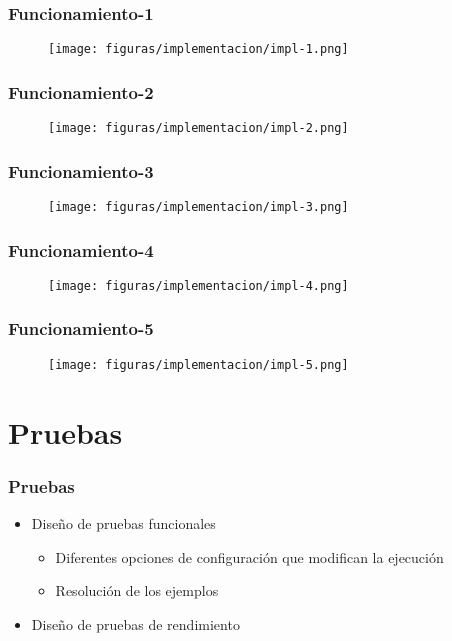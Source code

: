 \documentclass{beamer}
\begin{document}
\begin{frame}{}
    \frametitle{Funcionamiento-1}
    \begin{figure}[H]
        \centerline{\texttt{[image: figuras/implementacion/impl-1.png]}}
    \end{figure}
\end{frame}

\begin{frame}{}
    \frametitle{Funcionamiento-2}
    \begin{figure}[H]
        \centerline{\texttt{[image: figuras/implementacion/impl-2.png]}}
    \end{figure}
\end{frame}

\begin{frame}{}
    \frametitle{Funcionamiento-3}
    \begin{figure}[H]
        \centerline{\texttt{[image: figuras/implementacion/impl-3.png]}}
    \end{figure}
\end{frame}

\begin{frame}{}
    \frametitle{Funcionamiento-4}
    \begin{figure}[H]
        \centerline{\texttt{[image: figuras/implementacion/impl-4.png]}}
    \end{figure}
\end{frame}


\begin{frame}{}
    \frametitle{Funcionamiento-5}
    \begin{figure}[H]
        \centerline{\texttt{[image: figuras/implementacion/impl-5.png]}}
    \end{figure}
\end{frame}

\section{Pruebas}

\begin{frame}{}
    \frametitle{Pruebas}
    \begin{itemize}
        \item Diseño de pruebas funcionales
        \begin{itemize}
            \item Diferentes opciones de configuración que modifican la ejecución
            \item Resolución de los ejemplos
        \end{itemize}
        \item Diseño de pruebas de rendimiento
    \end{itemize}
\end{frame}
\end{document}

